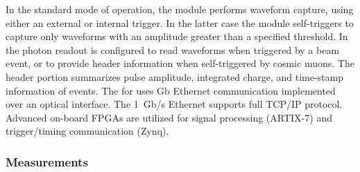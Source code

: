 
In the standard mode of operation, the module performs waveform capture, using either an external or internal trigger. In the latter case the module self-triggers to capture only waveforms with an amplitude greater than a specified threshold. In  the photon readout is configured to read waveforms when triggered by a beam event, or to provide header information when self-triggered by cosmic muons.
The header portion summarizes pulse amplitude, integrated charge, and time-stamp information of events. The  for  uses \si{Gb} Ethernet 
communication implemented over an optical interface. The \SI{1}{Gb/s} Ethernet supports full TCP/IP protocol.  Advanced on-board FPGAs are utilized for signal processing (ARTIX-7) and trigger/timing communication (Zynq).



\subsubsection{  Measurements}
\label{sec:protodune-results}

